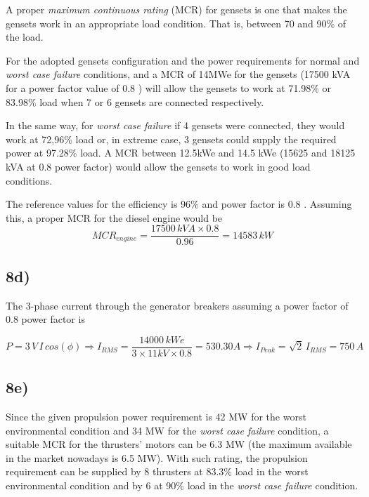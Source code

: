 A proper \textit{maximum continuous rating} (MCR) for gensets is one that makes the gensets work in an appropriate load condition. That is, between 70 and 90\% of the load.  

For the adopted gensets configuration and the power requirements for normal and \textit{worst case failure} conditions, and a MCR of 14MWe for the gensets (17500 kVA for a power factor value of 0.8 \cite{CatGenerators}) will allow the gensets to work at 71.98\% or 83.98\% load when 7 or 6 gensets are connected respectively. 

In the same way, for \textit{worst case failure} if 4 gensets were connected, they would work at 72,96\% load or, in extreme case, 3 gensets could supply the required power at 97.28\% load. A MCR between 12.5kWe and 14.5 kWe (15625 and 18125 kVA at 0.8 power factor) would allow the gensets to work in good load conditions. 

The reference values for the efficiency is 96\% and power factor is 0.8 \cite{CatGenerators}. Assuming this, a proper MCR for the diesel engine would be
\[
MCR_{engine}=\frac{17500 \, kV\!A \times 0.8}{0.96}=14583 \, kW
\]


\subsection*{8d)}


The 3-phase current through the generator breakers assuming a power factor of 0.8 power factor is

\[
P=3\,V\,I\,cos(\phi) \Rightarrow I_{RMS}=\frac{14000 \, kW\!e}{3 \times 11 kV \times 0.8}=530.30 A \Rightarrow I_{Peak}=\sqrt{2}\,I_{RMS}=750\,A
\]

\subsection*{8e)}


Since the given propulsion power requirement is 42 MW for the worst environmental condition and 34 MW for the \textit{worst case failure} condition, a suitable MCR for the thrusters' motors can be 6.3 MW (the maximum available in the market nowadays is 6.5 MW). With such rating, the propulsion requirement can be supplied by 8 thrusters at 83.3\% load in the worst environmental condition and by 6 at 90\% load in the \textit{worst case failure} condition. 

